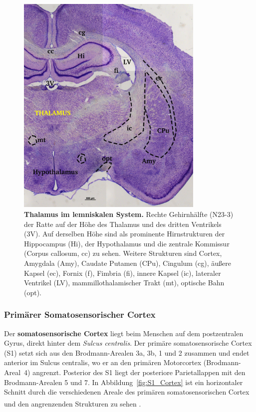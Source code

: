 \begin{figure}[H]
    \centering
    \includegraphics[width = 0.8\textwidth]
    {pictures/somatosensory/thalamus_somato.png}
    \caption[Thalamus im lemniskalen System]{\textbf{Thalamus im lemniskalen System.} Rechte Gehirnhälfte (N23-3) der Ratte auf der Höhe des Thalamus und des dritten Ventrikels (3V). Auf derselben Höhe sind als prominente Hirnstrukturen der Hippocampus (Hi), der Hypothalamus und die zentrale Kommissur (Corpus callosum, cc) zu sehen. Weitere Strukturen sind Cortex, Amygdala (Amy), Caudate Putamen (CPu), Cingulum (cg), äußere Kapsel (ec), Fornix (f), Fimbria (fi), innere Kapsel (ic), lateraler Ventrikel (LV), mammillothalamischer Trakt (mt), optische Bahn (opt).}
    \label{fig:thalamus_somato}
\end{figure}

\subsubsection*{Primärer Somatosensorischer Cortex}
\label{subsubsec:S1}
Der \textbf{somatosensorische Cortex}  liegt beim Menschen auf dem postzentralen Gyrus, direkt hinter dem \textit{Sulcus centralis}. Der primäre somatosensorische Cortex (S1) setzt sich aus den Brodmann-Arealen 3a, 3b, 1 und 2 zusammen und endet anterior im Sulcus centralis, wo er an den primären Motorcortex (Brodmann-Areal~4) angrenzt. Posterior des S1 liegt der posteriore Parietallappen mit den Brodmann-Arealen 5 und 7. In Abbildung~\ref{fig:S1_Cortex} ist ein horizontaler Schnitt durch die verschiedenen Areale des primären somatosensorischen Cortex und den angrenzenden Strukturen zu sehen \textsuperscript{\cite[Kap.~23]{kandel2013principles}}. 

